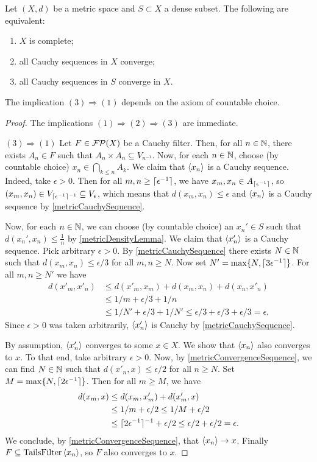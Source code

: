 \begin{proposition} \label{completenessCriterion}
Let $(X,d)$ be a metric space and $S\subset X$ a dense subset. The following are equivalent:
\begin{enumerate}
\item $X$ is complete;
\item all Cauchy sequences in $X$ converge;
\item all Cauchy sequences in $S$ converge in $X$.
\end{enumerate}
\end{proposition}
The implication $(3) \Rightarrow (1)$ depends on the axiom of countable choice.
\begin{proof}
The implications $(1) \Rightarrow (2) \Rightarrow (3)$ are immediate.

$(3) \Rightarrow (1)$ Let $F\in \operatorname{\mathcal{FP}}(X)$ be a Cauchy filter. Then, for all $n\in\mathbb{N}$, there exists $A_n\in F$ such that $A_n\times A_n \subseteq V_{n^{-1}}$. Now, for each $n\in \mathbb{N}$, choose (by countable choice) $x_n\in \bigcap_{k\leq n}A_k$. We claim that $\left\langle x_n \right\rangle$ is a Cauchy sequence.
Indeed, take $\epsilon >0$. Then for all $m,n\geq \lceil\epsilon^{-1}\rceil$, we have $x_m,x_n\in A_{\lceil\epsilon^{-1}\rceil}$, so $(x_m, x_n) \in V_{\lceil\epsilon^{-1}\rceil^{-1}} \subseteq V_{\epsilon}$, which means that $d(x_m, x_n) \leq \epsilon$ and $\left\langle x_n \right\rangle$ is a Cauchy sequence by \ref{metricCauchySequence}.

Now, for each $n\in \mathbb{N}$, we can choose (by countable choice) an $x_n'\in S$ such that $d(x_n', x_n)\leq \frac{1}{n}$ by \ref{metricDensityLemma}.
We claim that $\left\langle x_n' \right\rangle$ is a Cauchy sequence. Pick arbitrary $\epsilon >0$. By \ref{metricCauchySequence} there exists $N\in \mathbb{N}$ such that $d(x_m,x_n)\leq \epsilon / 3$ for all $m,n\geq N$. Now set $N' = \max\{N, \lceil3\epsilon^{-1}\rceil\}$. For all $m,n\geq N'$ we have
\begin{align*}
d(x'_m, x'_n) &\leq d(x'_m, x_m) + d(x_m, x_n) + d(x_n, x'_n) \\
&\leq 1/m + \epsilon/3 + 1/n \\
&\leq 1/N' + \epsilon/3 + 1/N' \leq \epsilon/3 + \epsilon/3 + \epsilon/3 = \epsilon.
\end{align*}
Since $\epsilon > 0$ was taken arbitrarily, $\left\langle x'_n \right\rangle$ is Cauchy by \ref{metricCauchySequence}.

By assumption, $\left\langle x'_n \right\rangle$ converges to some $x\in X$. We show that $\left\langle x_n \right\rangle$ also converges to $x$. To that end, take arbitrary $\epsilon > 0$. Now, by \ref{metricConvergenceSequence}, we can find $N\in \mathbb{N}$ such that $d(x'_n, x)\leq \epsilon / 2$ for all $n\geq N$. Set $M = \max\{N, \lceil2\epsilon^{-1}\rceil\}$. Then for all $m \geq M$, we have
\begin{align*}
d(x_m, x) &\leq d(x_m, x'_m) + d(x'_m, x) \\
&\leq 1/m + \epsilon/2 \leq 1/M + \epsilon/2 \\
&\leq \lceil2\epsilon^{-1}\rceil^{-1} + \epsilon/2 \leq \epsilon/2 + \epsilon/2 = \epsilon.
\end{align*}
We conclude, by \ref{metricConvergenceSequence}, that $\left\langle x_n \right\rangle\to x$. Finally $F \subseteq \operatorname{TailsFilter}\left\langle x_n \right\rangle$, so $F$ also converges to $x$.
\end{proof}

